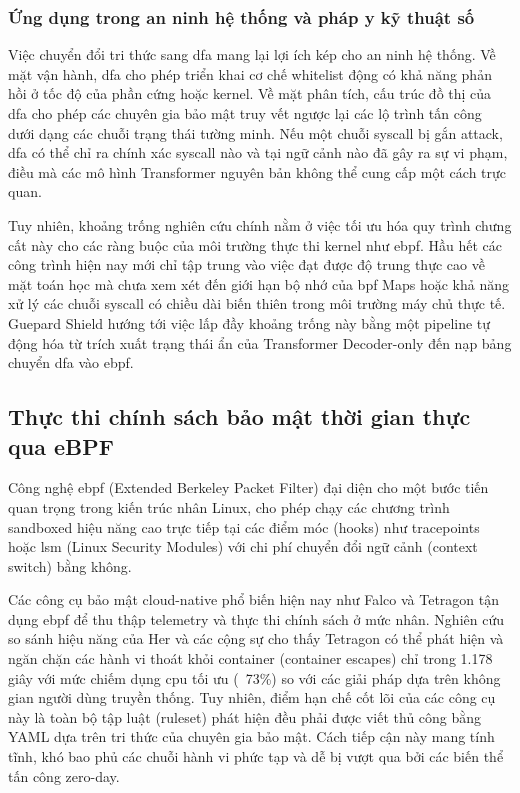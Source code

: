 \documentclass[../main.tex]{subfiles}
\begin{document}
\subsubsection{Ứng dụng trong an ninh hệ thống và pháp y kỹ thuật số}
Việc chuyển đổi tri thức sang \gls{dfa} mang lại lợi ích kép cho an ninh hệ
thống. Về mặt vận hành, \gls{dfa} cho phép triển khai cơ chế whitelist động
có khả năng phản hồi ở tốc độ của phần cứng hoặc kernel. Về mặt phân
tích, cấu trúc đồ thị của \gls{dfa} cho phép các chuyên gia bảo mật truy
vết ngược lại các lộ trình tấn công dưới dạng các chuỗi trạng thái
tường minh. Nếu một chuỗi \gls{syscall} bị gắn attack, \gls{dfa} có thể chỉ ra
chính xác \gls{syscall} nào và tại ngữ cảnh nào đã gây ra sự vi phạm, điều
mà các mô hình Transformer nguyên bản không thể cung cấp một cách trực quan.

Tuy nhiên, khoảng trống nghiên cứu chính nằm ở việc tối ưu hóa quy
trình chưng cất này cho các ràng buộc của môi trường thực thi kernel
như \gls{ebpf}. Hầu hết các công trình hiện nay mới chỉ tập trung vào việc
đạt được độ trung thực cao về mặt toán học mà chưa xem xét đến giới
hạn bộ nhớ của \gls{bpf} Maps hoặc khả năng xử lý các chuỗi \gls{syscall} có
chiều dài biến thiên trong môi trường máy chủ thực tế. Guepard Shield
hướng tới việc lấp đầy khoảng trống này bằng một pipeline tự động hóa
từ trích xuất trạng thái ẩn của Transformer Decoder-only đến nạp bảng
chuyển \gls{dfa} vào \gls{ebpf}.

\subsection{Thực thi chính sách bảo mật thời gian thực qua eBPF}
Công nghệ \gls{ebpf} (Extended Berkeley Packet Filter) đại diện cho một
bước tiến quan trọng trong kiến trúc nhân Linux, cho phép chạy các
chương trình sandboxed hiệu năng cao trực tiếp tại các điểm móc
(hooks) như tracepoints hoặc \gls{lsm} (Linux Security Modules) với chi phí
chuyển đổi ngữ cảnh (context switch) bằng không.

Các công cụ bảo mật cloud-native phổ biến hiện nay như Falco và
Tetragon \cite{her2025indepth} tận dụng \gls{ebpf} để thu thập telemetry và
thực thi chính sách ở mức nhân. Nghiên cứu so sánh hiệu năng của Her
và các cộng sự \cite{her2025indepth} cho thấy Tetragon có thể phát
hiện và ngăn chặn các hành vi thoát khỏi container (container
escapes) chỉ trong 1.178 giây với mức chiếm dụng \gls{cpu} tối ưu (~73\%)
so với các giải pháp dựa trên không gian người dùng truyền thống. Tuy
nhiên, điểm hạn chế cốt lõi của các công cụ này là toàn bộ tập luật
(ruleset) phát hiện đều phải được viết thủ công bằng YAML dựa trên
tri thức của chuyên gia bảo mật. Cách tiếp cận này mang tính tĩnh,
khó bao phủ các chuỗi hành vi phức tạp và dễ bị vượt qua bởi các biến
thể tấn công zero-day.
\end{document}
